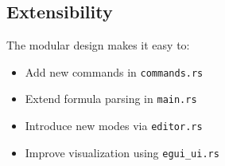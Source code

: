 \documentclass{article}
\begin{document}
\subsection{Extensibility}

The modular design makes it easy to:
\begin{itemize}
  \item Add new commands in \texttt{commands.rs}
  \item Extend formula parsing in \texttt{main.rs}
  \item Introduce new modes via \texttt{editor.rs}
  \item Improve visualization using \texttt{egui\_ui.rs}
\end{itemize}
\end{document}
